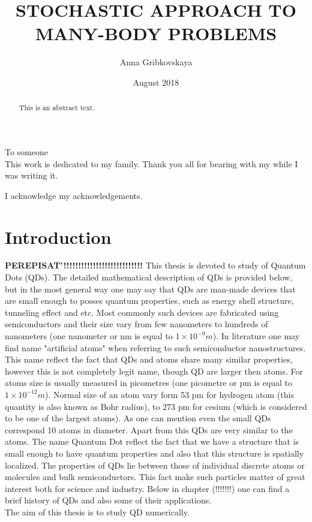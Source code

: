 \documentclass[twoside,english]{uiofysmaster}
\author{Anna Gribkovskaya}
\title{\uppercase{Stochastic Approach to Many-Body problems}}
\date{August 2018}
\theoremstyle{definition}
\begin{document}
\begin{titlepage}
\maketitle
\end{titlepage}
\begin{abstract}
	This is an abstract text.
\end{abstract}

\begin{dedication}
	To someone
	\\\vspace{12pt}
	This work is dedicated to my family. Thank you all for bearing with my while I was writing it.
\end{dedication}
\begin{acknowledgements}
	I acknowledge my acknowledgements.
\end{acknowledgements}
\tableofcontents

\chapter*{Introduction}
\textbf{PEREPISAT'!!!!!!!!!!!!!!!!!!!!!!!!!!!}
This thesis is devoted to study of Quantum Dots (QDs). The detailed mathematical description of QDs is provided below, but in the most general way one may say that QDs are man-made devices that are small enough to posses quantum properties, such as energy shell structure, tunneling effect and etc. Most commonly such devices are fabricated using semiconductors and their size vary from few nanometers to hundreds of nanometers (one nanometer or nm is equal to $1\times 10^{-9} m$). In literature one may find name "artificial atoms" when referring to such  semiconductor nanostructures. This name reflect the fact that QDs and atoms share many similar properties, however this is not completely legit name, though QD are larger then atoms. For atoms size is usually measured in picometres  (one picometre or pm is equal to $1\times 10^{-12} m$).  Normal size of an atom vary form 53 pm for hydrogen atom (this quantity is also known as Bohr radius), to  273 pm for cesium (which is considered to be one of the largest atoms). As one can mention even the small QDs correspond 10 atoms in diameter. Apart from this QDs are very similar to the atoms. The name Quantum Dot reflect the fact that we have a structure that is small enough to have quantum properties and also that this structure is spatially localized. The properties of QDs lie between those of individual discrete atoms or molecules and bulk semiconductors. This fact make such particles matter of great interest both for science and industry. Below in chapter (!!!!!!!) one can find a brief history of QDs and also  some of their applications.  \\
The aim of this thesis is to study QD numerically. 
\end{document}
